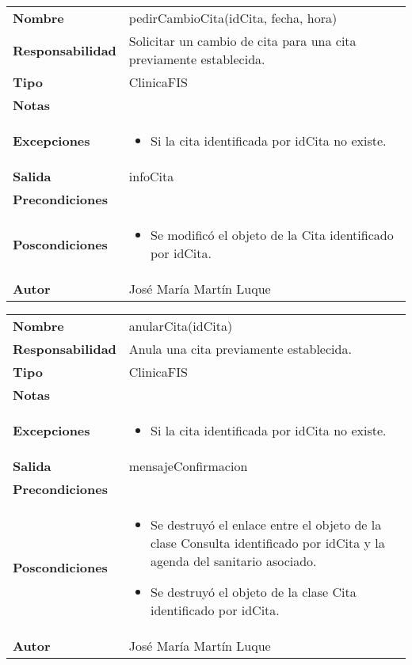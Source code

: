 \documentclass[11pt,a4paper]{article}
\newenvironment{itemizenomargins}
    {\begin{minipage}[t]{1\linewidth}\begin{itemize}}
    {\end{itemize}\end{minipage}}
\begin{document}
\begin{table}[H]
	\centering
	\label{pedir-cambio-cita}
	\begin{tabularx}{\textwidth}{l|X}
    \textbf{Nombre}          & pedirCambioCita(idCita, fecha, hora)\\
		\textbf{Responsabilidad} & Solicitar un cambio de cita para una cita previamente establecida. \\
		\textbf{Tipo}            & ClinicaFIS \\
		\textbf{Notas}           &  \\
		\textbf{Excepciones}     & 
		\begin{itemizenomargins}
			\item Si la cita identificada por idCita no existe.
		\end{itemizenomargins} \\
		\textbf{Salida}          &  infoCita\\
		\textbf{Precondiciones}  &  \\
		\textbf{Poscondiciones}  & 
		\begin{itemizenomargins}
			\item Se modificó el objeto de la Cita identificado por idCita.
		\end{itemizenomargins} \\
		\textbf{Autor}			 & José María Martín Luque
	\end{tabularx}
\end{table}

\begin{table}[H]
	\centering
	\label{anular-cita}
	\begin{tabularx}{\textwidth}{l|X}
    \textbf{Nombre}          & anularCita(idCita)\\
		\textbf{Responsabilidad} & Anula una cita previamente establecida. \\
		\textbf{Tipo}            & ClinicaFIS \\
		\textbf{Notas}           &  \\
		\textbf{Excepciones}     & 
		\begin{itemizenomargins}
			\item Si la cita identificada por idCita no existe.
		\end{itemizenomargins} \\
		\textbf{Salida}          &  mensajeConfirmacion\\
		\textbf{Precondiciones}  &  \\
		\textbf{Poscondiciones}  & 
		\begin{itemizenomargins}
			\item Se destruyó el enlace entre el objeto de la clase Consulta identificado por idCita y la agenda del sanitario asociado.
			\item Se destruyó el objeto de la clase Cita identificado por idCita.
		\end{itemizenomargins} \\
		\textbf{Autor}			 & José María Martín Luque
	\end{tabularx}
\end{table}
\end{document}
